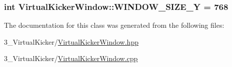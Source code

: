 \subsubsection[{\texorpdfstring{W\+I\+N\+D\+O\+W\+\_\+\+S\+I\+Z\+E\+\_\+Y}{WINDOW_SIZE_Y}}]{\setlength{\rightskip}{0pt plus 5cm}int Virtual\+Kicker\+Window\+::\+W\+I\+N\+D\+O\+W\+\_\+\+S\+I\+Z\+E\+\_\+Y = 768}\hypertarget{class_virtual_kicker_window_aee668d4989faeb64811c2a30a386b8fb}{}\label{class_virtual_kicker_window_aee668d4989faeb64811c2a30a386b8fb}


The documentation for this class was generated from the following files\+:\begin{DoxyCompactItemize}
\item 
3\+\_\+\+Virtual\+Kicker/\hyperlink{_virtual_kicker_window_8hpp}{Virtual\+Kicker\+Window.\+hpp}\item 
3\+\_\+\+Virtual\+Kicker/\hyperlink{_virtual_kicker_window_8cpp}{Virtual\+Kicker\+Window.\+cpp}\end{DoxyCompactItemize}
